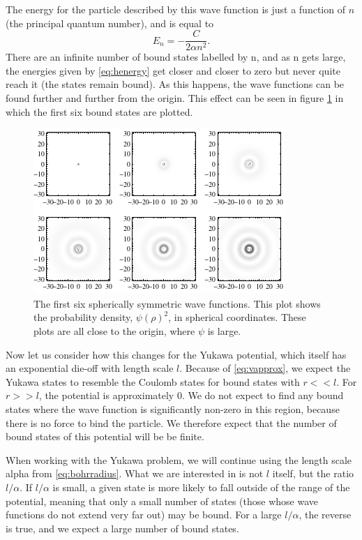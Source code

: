 \documentclass[12pt,twoside]{reedthesis}
\newcommand{\eqn}[1]{\begin{equation}#1\end{equation}}
\begin{document}
The energy for the particle described by this wave function is just a function of $n$ (the principal quantum number), and is equal to
\eqn{
E_n = -\frac{C}{2\alpha n^2}\mbox{.}
\label{eq:henergy}
}
There are an infinite number of bound states labelled by n, and as n gets large, the energies given by \eqref{eq:henergy} get closer and closer to zero but never quite reach it (the states remain bound). As this happens, the wave functions can be found further and further from the origin. This effect can be seen in figure \ref{fig:boundstates} in which the first six bound states are plotted.

\begin{figure}[h]
\centering
\includegraphics{Figures/densityplots}
\caption[Density plots of the first six spherically symmetric Coulomb wave functions]{The first six spherically symmetric wave functions. This plot shows the probability density, $\psi(\rho)^2$, in spherical coordinates. These plots are all close to the origin, where $\psi$ is large.}
\label{fig:boundstates}
\end{figure}

Now let us consider how this changes for the Yukawa potential, which itself has an exponential die-off with length scale $l$. Because of \eqref{eq:vapprox}, we expect the Yukawa states to resemble the Coulomb states for bound states with $r << l$. For $r >> l$, the potential is approximately $0$. We do not expect to find any bound states where the wave function is significantly non-zero in this region, because there is no force to bind the particle. We therefore expect that the number of bound states of this potential will be be finite.

When working with the Yukawa problem, we will continue using the length scale alpha from \eqref{eq:bohrradius}. What we are interested in is not $l$ itself, but the ratio $l / \alpha$.
If $l / \alpha$ is small, a given state is more likely to fall outside of the range of the potential, meaning that only a small number of states (those whose wave functions do not extend very far out) may be bound. For a large $l / \alpha$, the reverse is true, and we expect a large number of bound states.
\end{document}
